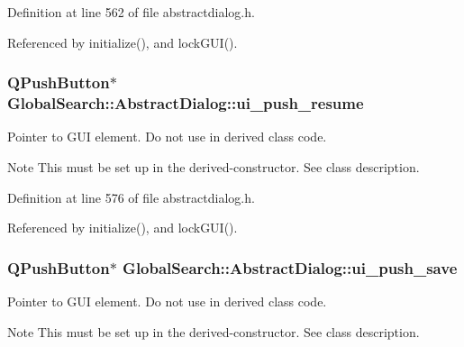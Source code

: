 Definition at line 562 of file abstractdialog.\-h.



Referenced by initialize(), and lock\-G\-U\-I().

\hypertarget{classGlobalSearch_1_1AbstractDialog_a04a1131601c5eab39ef105f385aceca5}{
\subsubsection[{ui\-\_\-push\-\_\-resume}]{\setlength{\rightskip}{0pt plus 5cm}Q\-Push\-Button$\ast$ Global\-Search\-::\-Abstract\-Dialog\-::ui\-\_\-push\-\_\-resume\hspace{0.3cm}{\ttfamily [protected]}}}\label{classGlobalSearch_1_1AbstractDialog_a04a1131601c5eab39ef105f385aceca5}
Pointer to G\-U\-I element. Do not use in derived class code. \begin{DoxyNote}{Note}
This must be set up in the derived-\/constructor. See class description. 
\end{DoxyNote}


Definition at line 576 of file abstractdialog.\-h.



Referenced by initialize(), and lock\-G\-U\-I().

\hypertarget{classGlobalSearch_1_1AbstractDialog_a695ed25af57ce8c854e21d3f2c18e250}{
\subsubsection[{ui\-\_\-push\-\_\-save}]{\setlength{\rightskip}{0pt plus 5cm}Q\-Push\-Button$\ast$ Global\-Search\-::\-Abstract\-Dialog\-::ui\-\_\-push\-\_\-save\hspace{0.3cm}{\ttfamily [protected]}}}\label{classGlobalSearch_1_1AbstractDialog_a695ed25af57ce8c854e21d3f2c18e250}
Pointer to G\-U\-I element. Do not use in derived class code. \begin{DoxyNote}{Note}
This must be set up in the derived-\/constructor. See class description. 
\end{DoxyNote}


